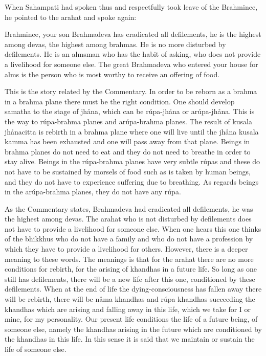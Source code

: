 \documentclass[12pt,twoside]{article}
\begin{document}
When Sahampati had spoken thus and respectfully took leave of the
Brahminee, he pointed to the arahat and spoke again:

{\textasciigrave}{\textasciigrave}Brahminee, your son Brahmadeva has
eradicated all defilements, he is the highest among devas, the highest
among brahmas. He is no more disturbed by defilements. He is an almsman
who has the habit of asking, who does not provide a livelihood for
someone else. The great Brahmadeva who entered your house for alms is
the person who is most worthy to receive an offering of food.
{\textquotesingle}{\textquotesingle}


\bigskip

This is the story related by the Commentary. In order to be reborn as a
brahma in a brahma plane there must be the right condition. One should
develop samatha to the stage of jh{\aa}na, which can be
r\'upa{}-jh{\aa}na or ar\'upa{}-jh{\aa}na. This is the way to
r\'upa{}-brahma planes and ar\'upa{}-brahma planes. The result of
kusala jh{\aa}nacitta is rebirth in a brahma plane where one will live
until the jh{\aa}na kusala kamma has been exhausted and one will pass
away from that plane. Beings in brahma planes do not need to eat and
they do not need to breathe in order to stay alive. Beings in the
r\'upa{}-brahma planes have very subtle r\'upas and these do not have
to be sustained by morsels of food such as is taken by human beings,
and they do not have to experience suffering due to breathing. As
regards beings in the ar\'upa{}-brahma planes, they do not have any
r\'upa. 

As the Commentary states, Brahmadeva had eradicated all defilements, he
was the highest among devas. The arahat who is not disturbed by
defilements does not have to provide a livelihood for someone else.
When one hears this one thinks of the bhikkhus who do not have a family
and who do not have a profession by which they have to provide a
livelihood for others. However, there is a deeper meaning to these
words. The meanings is that for the arahat there are no more conditions
for rebirth, for the arising of khandhas in a future life. So long as
one still has defilements, there will be a new life after this one,
conditioned by these defilements. When at the end of life the
dying{}-consciousness has fallen away there will be rebirth, there will
be n{\aa}ma khandhas and r\'upa khandhas succeeding the khandhas which
are arising and falling away in this life, which we take for
{\textasciigrave}{\textasciigrave}I{\textquotesingle}{\textquotesingle}
or
{\textasciigrave}{\textasciigrave}mine{\textquotesingle}{\textquotesingle},
for {\textasciigrave}{\textasciigrave}my
personality{\textquotesingle}{\textquotesingle}. Our present life
conditions the life of a future being, of someone else, namely the
khandhas arising in the future which are conditioned by the khandhas in
this life. In this sense it is said that we maintain or sustain the
life of someone else. 
\end{document}
